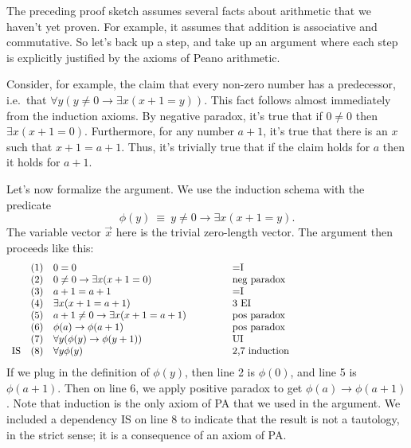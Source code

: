 The preceding proof sketch assumes several facts about arithmetic that
we haven't yet proven.  For example, it assumes that addition is
associative and commutative.  So let's back up a step, and take up an
argument where each step is explicitly justified by the axioms of
Peano arithmetic.

Consider, for example, the claim that every non-zero number has a
predecessor, i.e.\ that $\forall y(y\neq 0\to \exists x(x+1=y))$.
This fact follows almost immediately from the induction axioms.  By
negative paradox, it's true that if $0\neq 0$ then $\exists
x(x+1=0)$.  Furthermore, for any number $a+1$, it's true that there is
an $x$ such that $x+1=a+1$.  Thus, it's trivially true that if the
claim holds for $a$ then it holds for $a+1$.  

Let's now formalize the argument.  We use the induction schema with
the predicate
\[ \phi (y)\:\equiv \: y\neq 0\to\exists x(x+1=y) .\] The variable
vector $\vec{x}$ here is the trivial zero-length vector.  The argument
then proceeds like this:
\[ \begin{array}{l l >{$}p{6cm}<{$} p{6cm}}
      & (1) & 0=0 & $=$I \\
      & (2) & 0\neq 0\to \exists x(x+1=0)  & neg paradox \\
      & (3) & a+1=a+1 & $=$I \\
      & (4) & \exists x(x+1=a+1) & 3 EI \\
      & (5) & a+1\neq 0\to \exists x(x+1=a+1) & pos paradox \\
      & (6) & \phi (a)\to \phi (a+1)  & pos paradox \\
      & (7) & \forall y(\phi (y)\to \phi (y+1)) & UI \\
   \text{IS} & (8) & \forall y\phi (y) & 2,7 induction \end{array} \] If we
plug in the definition of $\phi (y)$, then line 2 is $\phi (0)$, and
line 5 is $\phi (a+1)$.  Then on line 6, we apply positive paradox to
get $\phi (a)\to \phi (a+1)$.  Note that induction is the only axiom
of PA that we used in the argument.  We included a dependency IS on
line 8 to indicate that the result is not a tautology, in the strict
sense; it is a consequence of an axiom of PA.


 
 

